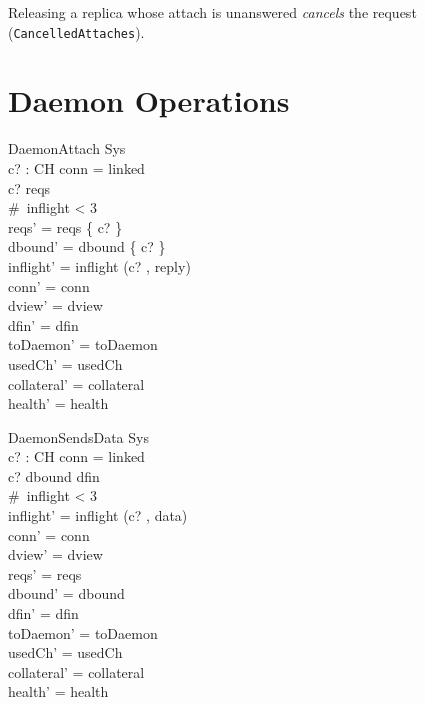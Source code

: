 \documentclass[a4paper,10pt,fleqn]{article}
\begin{document}
Releasing a replica whose attach is unanswered \emph{cancels} the request
(\texttt{CancelledAttaches}).

\section{Daemon Operations}

\begin{schema}{DaemonAttach}
  \Delta Sys \\
  c? : CH
\where
  conn = linked \\
  c? \in reqs \\
  \#~inflight < 3 \\
  reqs' = reqs \setminus \{ c? \} \\
  dbound' = dbound \cup \{ c? \} \\
  inflight' = inflight \cat \langle (c? , reply) \rangle \\
  conn' = conn \\
  dview' = dview \\
  dfin' = dfin \\
  toDaemon' = toDaemon \\
  usedCh' = usedCh \\
  collateral' = collateral \\
  health' = health
\end{schema}

\begin{schema}{DaemonSendsData}
  \Delta Sys \\
  c? : CH
\where
  conn = linked \\
  c? \in dbound \setminus dfin \\
  \#~inflight < 3 \\
  inflight' = inflight \cat \langle (c? , data) \rangle \\
  conn' = conn \\
  dview' = dview \\
  reqs' = reqs \\
  dbound' = dbound \\
  dfin' = dfin \\
  toDaemon' = toDaemon \\
  usedCh' = usedCh \\
  collateral' = collateral \\
  health' = health
\end{schema}
\end{document}
